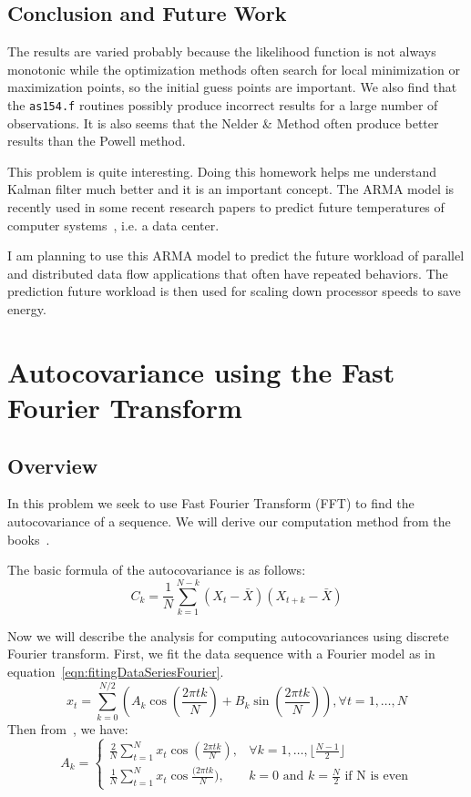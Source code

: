 \documentclass{article}
\begin{document}
 \subsection{Conclusion and Future Work}
The results are varied probably because the likelihood function is not always
 monotonic while the optimization methods often search for local minimization
 or maximization points, so the initial guess points are important. We also find
 that the \texttt{as154.f} routines possibly produce incorrect results for a
 large number of observations. It is also seems that the Nelder \& Method often
 produce better results than the Powell method.
 
 This problem is quite interesting. Doing this homework helps me understand
 Kalman filter much better and it is an important concept. The ARMA model is
 recently used in some recent research papers to predict future temperatures of computer systems~\cite{CoskunThermalBalancingMPSoCs, CoskunThermalMngMPSoC}, i.e. a data
 center.
 
 I am planning to use this ARMA model to predict the future workload of parallel 
and distributed data flow applications that often have repeated behaviors. The
prediction future workload is then used for scaling down processor speeds to
save energy.
 
 \section{Autocovariance using the Fast Fourier Transform}
 \subsection{Overview}
 In this problem we seek to use Fast Fourier Transform (FFT) to find the
 autocovariance of a sequence. We will derive our computation method from the
 books~\cite{BoxTimeSeries, FalkStatSAS}.
 
 The basic formula of the autocovariance is as follows:
 \begin{equation}\label{eqn:basicAutocovariance}
 C_k=\frac{1}{N}\sum_{k=1}^{N-k}(X_t-\bar{X})(X_{t+k}-\bar{X})
 \end{equation} 
 
 Now we will describe the analysis for computing autocovariances using discrete
 Fourier transform. First, we fit the data sequence with a Fourier model as in
 equation~\ref{eqn:fitingDataSeriesFourier}.
 \begin{equation}\label{eqn:fitingDataSeriesFourier}
 x_t = \sum_{k=0}^{N/2}(A_k \cos(\frac{2\pi tk}{N}) + B_k \sin(\frac{2\pi
 tk}{N})), \forall t = 1, \ldots, N
 \end{equation}
 Then from~\cite{BoxTimeSeries, FalkStatSAS}, we have:
 \begin{equation}\label{eqn:coeffienceA}
 A_k =  \left\{ \begin{array}{rcl}
 \frac{2}{N}\sum_{t = 1}^{N}x_t\cos(\frac{2\pi
 tk}{N}), & \forall k = 1, \ldots, \lfloor\frac{N-1}{2}\rfloor \\
\frac{1}{N}\sum_{t = 1}^{N}x_t\cos\frac{(2\pi tk}{N}), & k = 0 \mbox{ and }
  k = \frac{N}{2} \mbox{ if N is even}
 \end{array}\right.
 \end{equation}
\end{document}
